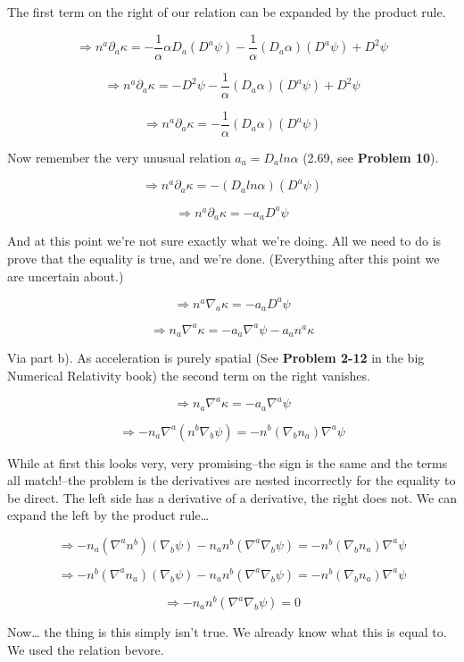 \documentclass[landscape,letterpaper,10pt,english]{article}
\begin{document}
    The first term on the right of our relation can be expanded by the
product rule.

\[ \Rightarrow n^a \partial_a \kappa = -\frac{1}{\alpha} \alpha D_a( D^a \psi) -\frac{1}{\alpha} (D_a\alpha) (D^a \psi) + D^2 \psi \]

\[ \Rightarrow n^a \partial_a \kappa = - D^2 \psi - \frac{1}{\alpha} (D_a\alpha) (D^a \psi) + D^2 \psi \]

\[ \Rightarrow n^a \partial_a \kappa = - \frac{1}{\alpha} (D_a\alpha) (D^a \psi) \]

Now remember the very unusual relation \(a_a = D_a ln\alpha\) (2.69, see
\textbf{Problem 10}).

\[ \Rightarrow n^a \partial_a \kappa = - (D_a ln\alpha) (D^a \psi) \]

\[ \Rightarrow n^a \partial_a \kappa = - a_a D^a \psi \]

And at this point we're not sure exactly what we're doing. All we need
to do is prove that the equality is true, and we're done. (Everything
after this point we are uncertain about.)

    \[ \Rightarrow n^a \nabla_a \kappa = - a_a D^a \psi \]

\[ \Rightarrow n_a \nabla^a \kappa = - a_a \nabla^a \psi - a_an^a\kappa\]

Via part b). As acceleration is purely spatial (See \textbf{Problem
2-12} in the big Numerical Relativity book) the second term on the right
vanishes.

\[ \Rightarrow n_a \nabla^a \kappa = - a_a \nabla^a \psi\]

\[ \Rightarrow -n_a \nabla^a (n^b\nabla_b \psi) = - n^b (\nabla_b n_a) \nabla^a \psi\]

While at first this looks very, very promising--the sign is the same and
the terms all match!--the problem is the derivatives are nested
incorrectly for the equality to be direct. The left side has a
derivative of a derivative, the right does not. We can expand the left
by the product rule\ldots{}

\[ \Rightarrow -n_a (\nabla^a n^b)(\nabla_b \psi) -n_a n^b (\nabla^a\nabla_b \psi) = - n^b (\nabla_b n_a) \nabla^a \psi\]

\[ \Rightarrow -n^b (\nabla^a n_a)(\nabla_b \psi) -n_a n^b (\nabla^a\nabla_b \psi) = - n^b (\nabla_b n_a) \nabla^a \psi\]

\[ \Rightarrow  -n_a n^b (\nabla^a\nabla_b \psi) = 0\]

    Now\ldots{} the thing is this simply isn't true. We already know what
this is equal to. We used the relation bevore.
\end{document}
